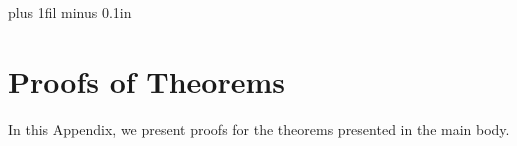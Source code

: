 \documentclass[twoside]{article}
\begin{document}




\clearpage
\onecolumn

\thispagestyle{empty}
  \hsize\textwidth
  \linewidth\hsize {}
 \bottomtitlebar \vskip 0.2in plus 1fil minus 0.1in

\section{Proofs of Theorems}

In this Appendix, we present proofs for the theorems presented in the main
body.
\end{document}
